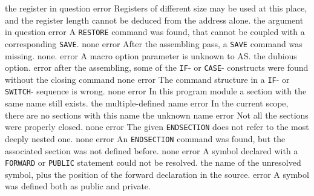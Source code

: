 \documentclass[12pt,twoside]{report}
\newcommand{\tty}[1]{{\tt #1}}
\begin{document}
\begin{description}
               {the register in question}
               {error}
               {Registers of different size may be used at this place, and
                 the register length cannot be deduced from the address alone.}
               {the argument in question}
               {error}
               {A \tty{RESTORE} command was found, that cannot be coupled with a
                corresponding \tty{SAVE}.}
               {none}
               {error}
               {After the assembling pass, a \tty{SAVE} command was missing.}
               {none.}
               {error}
               {A macro option parameter is unknown to AS.}
               {the dubious option.}
               {error}
               {after the assembling, some of the \tty{IF}- or \tty{CASE}- constructs
                were found without the closing command}
               {none}
               {error}
               {The command structure in a \tty{IF}- or \tty{SWITCH}- sequence is
                wrong.}
               {none}
               {error}
               {In this program module a section with the same name still
                exists.}
               {the multiple-defined name}
               {error}
               {In the current scope, there are no sections with this name}
               {the unknown name}
               {error}
               {Not all the sections were properly closed.}
               {none}
               {error}
               {The given \tty{ENDSECTION} does not refer to the most
                deeply nested one.}
               {none}
               {error}
               {An \tty{ENDSECTION} command was found, but the associated section
                was not defined before.}
               {none}
               {error}
               {A symbol declared with a \tty{FORWARD} or \tty{PUBLIC} statement could
                not be resolved.}
               {the name of the unresolved symbol, plus the
                position of the forward declaration in the
                source.}
               {error}
               {A symbol was defined both as public and private.}

\end{description}
\end{document}
